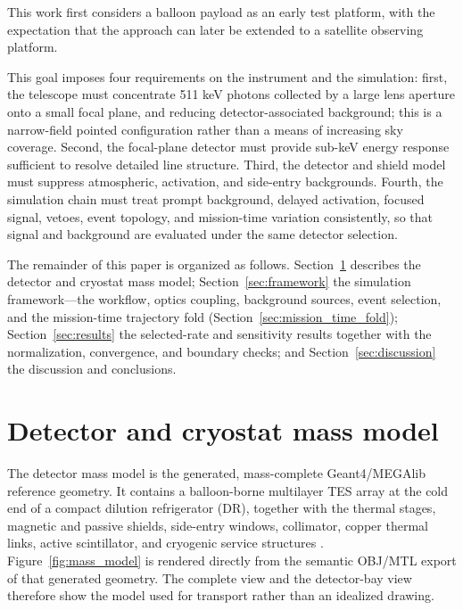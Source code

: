 \documentclass[11pt]{article}
\begin{document}
This work first considers a balloon payload as an early test platform, with the expectation that the approach can later be extended to a satellite observing platform.

This goal imposes four requirements on the instrument and the simulation: first, the telescope must concentrate 511 keV photons collected by a large lens aperture onto a small focal plane,  and reducing detector-associated background; this is a narrow-field pointed configuration rather than a means of increasing sky coverage. Second, the focal-plane detector must provide sub-keV energy response sufficient to resolve detailed line structure. Third, the detector and shield model must suppress atmospheric, activation, and side-entry backgrounds. Fourth, the simulation chain must treat prompt background, delayed activation, focused signal, vetoes, event topology, and mission-time variation consistently, so that signal and background are evaluated under the same detector selection.

The remainder of this paper is organized as follows. Section~\ref{sec:geometry} describes the detector and cryostat mass model; Section~\ref{sec:framework} the simulation framework---the workflow, optics coupling, background sources, event selection, and the mission-time trajectory fold (Section~\ref{sec:mission_time_fold}); Section~\ref{sec:results} the selected-rate and sensitivity results together with the normalization, convergence, and boundary checks; and Section~\ref{sec:discussion} the discussion and conclusions.

\section{Detector and cryostat mass model}
\label{sec:geometry}

The detector mass model is the generated, mass-complete Geant4/MEGAlib
reference geometry. It contains a balloon-borne multilayer TES array at the cold end of a
compact dilution refrigerator (DR), together with the thermal stages, magnetic
and passive shields, side-entry windows, collimator, copper thermal links,
active scintillator, and cryogenic service structures
\cite{Shirazi2023,Gottardi2021TESReview}. Figure~\ref{fig:mass_model} is rendered
directly from the semantic OBJ/MTL export of that generated geometry. The complete
view and the detector-bay view therefore show the model used for transport rather
than an idealized drawing.
\end{document}
